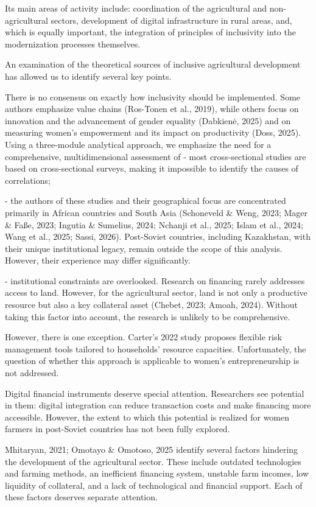 ﻿\documentclass[sn-mathphys-num]{sn-jnl}
\newcommand{\hl}[1]{#1}
\begin{document}
Its main areas of activity include: coordination of the agricultural and
non-agricultural sectors, development of digital infrastructure in rural
areas, and, which is equally important, the integration of principles of
inclusivity into the modernization processes themselves.

An examination of the theoretical sources of inclusive agricultural
development has allowed us to identify several key points.

There is no consensus on exactly how inclusivity should be implemented.
Some authors emphasize value chains (\hl{Ros-Tonen et al., 2019),} while
others focus on innovation and the advancement of gender equality
(Dabkienė, 2025) and on measuring women's empowerment and its impact on
productivity (Doss, 2025). Using a three-module analytical approach, we
emphasize the need for a comprehensive, multidimensional assessment of
- most cross-sectional studies are based on cross-sectional surveys,
making it impossible to identify the causes of correlations;

- the authors of these studies and their geographical focus are
concentrated primarily in African countries and South Asia
\hl{(Schoneveld \& Weng, 2023; Mager \& Faße, 2023; Ingutia \& Sumelius,
2024; Nchanji et al., 2025; Islam et al., 2024; Wang et al., 2025;
Sassi, 2026).} Post-Soviet countries, including Kazakhstan, with their
unique institutional legacy, remain outside the scope of this analysis.
However, their experience may differ significantly.

- institutional constraints are overlooked. Research on financing rarely
addresses access to land. However, for the agricultural sector, land is
not only a productive resource but also a key collateral asset
(\hl{Chebet, 2023}; \hl{Amoah, 2024}). Without taking this factor into
account, the research is unlikely to be comprehensive.

However, there is one exception. \hl{Carter's 2022} study proposes
flexible risk management tools tailored to households' resource
capacities. Unfortunately, the question of whether this approach is
applicable to women's entrepreneurship is not addressed.

Digital financial instruments deserve special attention. Researchers see
potential in them: digital integration can reduce transaction costs and
make financing more accessible. However, the extent to which this
potential is realized for women farmers in post-Soviet countries has not
been fully explored.

\hl{Mhitaryan, 2021; Omotayo \& Omotoso, 2025} identify several factors
hindering the development of the agricultural sector. These include
outdated technologies and farming methods, an inefficient financing
system, unstable farm incomes, low liquidity of collateral, and a lack
of technological and financial support. Each of these factors deserves
separate attention.
\end{document}
